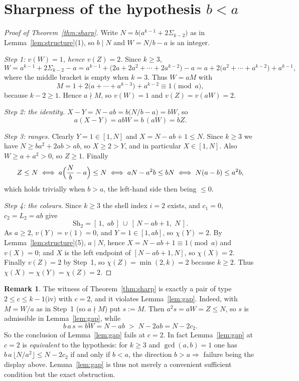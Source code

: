 \documentclass{amsart}
\theoremstyle{definition}
\newtheorem{remark}[theorem]{Remark}
\newcommand{\Sh}{\mathrm{Sh}}
\begin{document}
\section{Sharpness of the hypothesis $b<a$}

\begin{proof}[Proof of Theorem~\ref{thm:sharp}]
Write $N=b\bigl(a^{k-1}+2\Sigma_{k-2}\bigr)$ as in
Lemma~\ref{lem:structure}(1), so $b\mid N$ and $W=N/b-a$ is an integer.

\emph{Step 1: $v(W)=1$, hence $v(Z)=2$.}  Since $k\ge3$,
\[
  W=a^{k-1}+2\Sigma_{k-2}-a
   =a^{k-1}+\bigl(2a+2a^{2}+\cdots+2a^{k-2}\bigr)-a
   =a+2\bigl(a^{2}+\cdots+a^{k-2}\bigr)+a^{k-1},
\]
where the middle bracket is empty when $k=3$.  Thus $W=aM$ with
\[
  M=1+2\bigl(a+\cdots+a^{k-3}\bigr)+a^{k-2}\equiv1 \pmod a,
\]
because $k-2\ge1$.  Hence $a\nmid M$, so $v(W)=1$ and $v(Z)=v(aW)=2$.

\emph{Step 2: the identity.}  $X-Y=N-ab=b\bigl(N/b-a\bigr)=bW$, so
\[
  a(X-Y)=abW=b\,(aW)=bZ .
\]

\emph{Step 3: ranges.}  Clearly $Y=1\in[1,N]$ and $X=N-ab+1\le N$.  Since
$k\ge3$ we have $N\ge ba^{2}+2ab>ab$, so $X\ge2>Y$, and in particular
$X\in[1,N]$.  Also $W\ge a+a^{2}>0$, so $Z\ge1$.  Finally
\[
  Z\le N
  \iff a\Bigl(\frac{N}{b}-a\Bigr)\le N
  \iff aN-a^{2}b\le bN
  \iff N(a-b)\le a^{2}b ,
\]
which holds trivially when $b>a$, the left-hand side then being $\le0$.

\emph{Step 4: the colours.}  Since $k\ge3$ the shell index $i=2$ exists, and
$c_1=0$, $c_2=L_2=ab$ give
\[
  \Sh_2=[\,1,\;ab\,]\ \cup\ [\,N-ab+1,\;N\,].
\]
As $a\ge2$, $v(Y)=v(1)=0$, and $Y=1\in[1,ab]$, so $\chi(Y)=2$.  By
Lemma~\ref{lem:structure}(5), $a\mid N$, hence
$X=N-ab+1\equiv1\pmod a$ and $v(X)=0$; and $X$ is the left endpoint of
$[N-ab+1,N]$, so $\chi(X)=2$.  Finally $v(Z)=2$ by Step~1, so
$\chi(Z)=\min(2,k)=2$ because $k\ge2$.  Thus $\chi(X)=\chi(Y)=\chi(Z)=2$.
\end{proof}

\begin{remark}\label{rem:sharpgap}
The witness of Theorem~\ref{thm:sharp} is exactly a pair of type
$2\le c\le k-1$(iv) with $c=2$, and it violates Lemma~\ref{lem:gap}.  Indeed,
with $M=W/a$ as in Step~1 (so $a\nmid M$) put $s:=M$.  Then
$a^{2}s=aW=Z\le N$, so $s$ is admissible in Lemma~\ref{lem:gap}, while
\[
  b\,a\,s=bW=N-ab\;>\;N-2ab=N-2c_2 .
\]
So the conclusion of Lemma~\ref{lem:gap} fails at $c=2$.  In fact
Lemma~\ref{lem:gap} at $c=2$ is \emph{equivalent} to the hypothesis: for
$k\ge3$ and $\gcd(a,b)=1$ one has
$b\,a\,\lfloor N/a^{2}\rfloor\le N-2c_2$ if and only if $b<a$, the direction
$b>a\Rightarrow$ failure being the display above.  Lemma~\ref{lem:gap} is thus
not merely a convenient sufficient condition but the exact obstruction.
\end{remark}
\end{document}
